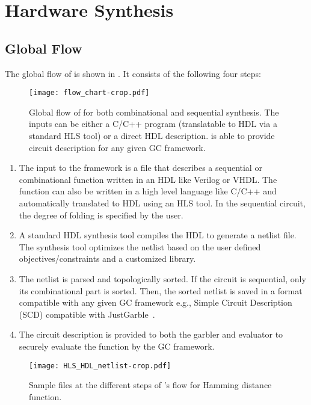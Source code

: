 \chapter{Hardware Synthesis}
\section{Global Flow}
The global flow of \sys{} is shown in .
It consists of the following four steps:

\begin{figure*}
\centering
\texttt{[image: flow\_chart-crop.pdf]}
\caption{Global flow of \sys{} for both combinational and sequential synthesis.
  The inputs can be either a C/C++ program (translatable to HDL via a standard HLS tool) or a direct HDL description.
  \sys{} is able to provide circuit description for any given GC framework.}
\label{fig:globalflow}
\end{figure*}

\begin{enumerate}
\item
  The input to the \sys{} framework is a file that describes a sequential or combinational function written in an HDL like Verilog or VHDL.
  The function can also be written in a high level language like C/C++ and automatically translated to HDL using an HLS tool.
  In the sequential circuit, the degree of folding is specified by the user.

\item
  A standard HDL synthesis tool compiles the HDL to generate a netlist file.
  The synthesis tool optimizes the netlist based on the user defined objectives/constraints and a customized library.

\item
  The netlist is parsed and topologically sorted.
  If the circuit is sequential, only its combinational part is sorted.
  Then, the sorted netlist is saved in a format compatible with any given GC framework e.g., Simple Circuit Description (SCD) compatible with JustGarble~\cite{bellare2013efficient}.

\item
  The circuit description is provided to both the garbler and evaluator to securely evaluate the function by the GC framework.
\end{enumerate}

\begin{figure*}
\centering
\texttt{[image: HLS\_HDL\_netlist-crop.pdf]}
\caption{Sample files at the different steps of \sys{}'s flow for Hamming distance function.}
\label{fig:globalflow_sample}
\end{figure*}

